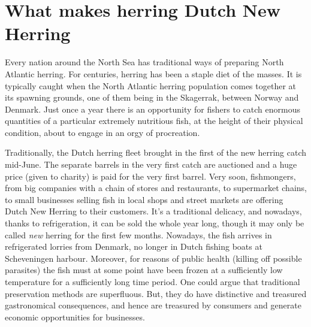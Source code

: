 \documentclass[alpha-refs]{wiley-article}
\begin{document}
\section{What makes herring Dutch New Herring}\label{dutchnewherring}

Every nation around the North Sea has traditional ways of preparing North Atlantic herring. For centuries, herring has been a staple diet of the masses. It is typically caught when the North Atlantic herring population comes together at its spawning grounds, one of them being in the \foreignlanguage{Norwegian}{Skagerrak}, between Norway and Denmark. Just once a year there is an opportunity for fishers to catch enormous quantities of a particular extremely nutritious fish, at the height of their physical condition, about to engage in an orgy of procreation. 

Traditionally, the Dutch herring fleet brought in the first of the new herring catch mid-June. The separate barrels in the very first catch are auctioned and a huge price (given to charity) is paid for the very first barrel. Very soon, fishmongers, from big companies with a chain of stores and restaurants, to supermarket chains, to small businesses selling fish in local shops and street markets are offering Dutch New Herring to their customers. It's a traditional delicacy, and nowadays, thanks to refrigeration, it can be sold the whole year long, though it may only be called \emph{new} herring for the first few months. Nowadays, the fish arrives in refrigerated lorries from Denmark, no longer in Dutch fishing boats at Scheveningen harbour. Moreover, for reasons of public health (killing off possible parasites) the fish must at some point have been frozen at a sufficiently low temperature for a sufficiently long time period. One could argue that traditional preservation methods are superfluous. But, they do have distinctive and treasured gastronomical consequences, and hence are treasured by consumers and generate economic opportunities for businesses. 
\end{document}
